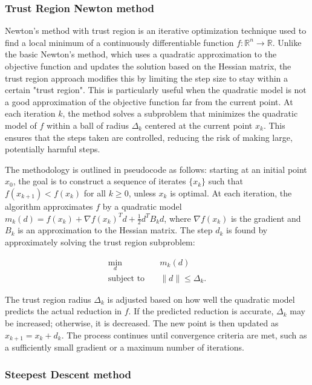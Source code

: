 \documentclass{article} %
\theoremstyle{definition}
\theoremstyle{remark}
\theoremstyle{plain}
\begin{document}
    \subsubsection{Trust Region Newton method}

    Newton's method with trust region is an iterative optimization technique used to find a local minimum of a continuously differentiable function \( f : \mathbb{R}^n \to \mathbb{R} \). Unlike the basic Newton's method, which uses a quadratic approximation to the objective function and updates the solution based on the Hessian matrix, the trust region approach modifies this by limiting the step size to stay within a certain "trust region". This is particularly useful when the quadratic model is not a good approximation of the objective function far from the current point. At each iteration \( k \), the method solves a subproblem that minimizes the quadratic model of \( f \) within a ball of radius \( \Delta_k \) centered at the current point \( x_k \). This ensures that the steps taken are controlled, reducing the risk of making large, potentially harmful steps.

    The methodology is outlined in pseudocode as follows: starting at an initial point \( x_0 \), the goal is to construct a sequence of iterates \( \{ x_k \} \) such that \( f(x_{k+1}) < f(x_k) \) for all \( k \geq 0 \), unless \( x_k \) is optimal. At each iteration, the algorithm approximates \( f \) by a quadratic model \( m_k(d) = f(x_k) + \nabla f(x_k)^T d + \frac{1}{2} d^T B_k d \), where \( \nabla f(x_k) \) is the gradient and \( B_k \) is an approximation to the Hessian matrix. The step \( d_k \) is found by approximately solving the trust region subproblem:
    
    \begin{align*}
        \min_{d} \quad & m_k(d) \\
        \textrm{subject to} \quad  & \|d\| \leq \Delta_k.
    \end{align*}
    
    The trust region radius \( \Delta_k \) is adjusted based on how well the quadratic model predicts the actual reduction in \( f \). If the predicted reduction is accurate, \( \Delta_k \) may be increased; otherwise, it is decreased. The new point is then updated as \( x_{k+1} = x_k + d_k \). The process continues until convergence criteria are met, such as a sufficiently small gradient or a maximum number of iterations.
    
    \subsubsection{Steepest Descent method}
    
\end{document}
